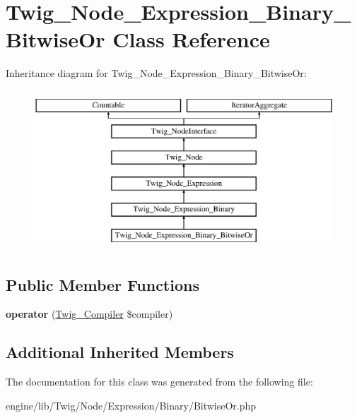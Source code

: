 \hypertarget{class_twig___node___expression___binary___bitwise_or}{}\section{Twig\+\_\+\+Node\+\_\+\+Expression\+\_\+\+Binary\+\_\+\+Bitwise\+Or Class Reference}
\label{class_twig___node___expression___binary___bitwise_or}
Inheritance diagram for Twig\+\_\+\+Node\+\_\+\+Expression\+\_\+\+Binary\+\_\+\+Bitwise\+Or\+:\begin{figure}[H]
\begin{center}
\leavevmode
\includegraphics[height=6.000000cm]{class_twig___node___expression___binary___bitwise_or}
\end{center}
\end{figure}
\subsection*{Public Member Functions}
\begin{DoxyCompactItemize}
\item 
\hypertarget{class_twig___node___expression___binary___bitwise_or_af77318ec88d5f8a508684970a150b670}{}{\bfseries operator} (\hyperlink{class_twig___compiler}{Twig\+\_\+\+Compiler} \$compiler)\label{class_twig___node___expression___binary___bitwise_or_af77318ec88d5f8a508684970a150b670}

\end{DoxyCompactItemize}
\subsection*{Additional Inherited Members}


The documentation for this class was generated from the following file\+:\begin{DoxyCompactItemize}
\item 
engine/lib/\+Twig/\+Node/\+Expression/\+Binary/Bitwise\+Or.\+php\end{DoxyCompactItemize}
